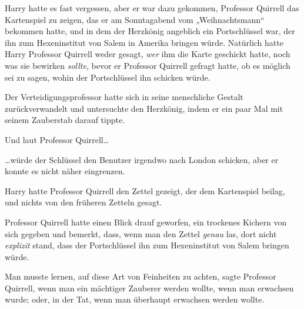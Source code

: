 Harry hatte es fast vergessen, aber er war dazu gekommen, Professor Quirrell das Kartenspiel zu zeigen, das er am Sonntagabend vom „Weihnachtsmann“ bekommen hatte, und in dem der Herzkönig angeblich ein Portschlüssel war, der ihn zum Hexeninstitut von Salem in Amerika bringen würde. Natürlich hatte Harry Professor Quirrell weder gesagt, \emph{wer} ihm die Karte geschickt hatte, noch was sie bewirken \emph{sollte}, bevor er Professor Quirrell gefragt hatte, ob es möglich sei zu sagen, wohin der Portschlüssel ihn schicken würde.

Der Verteidigungsprofessor hatte sich in seine menschliche Gestalt zurückverwandelt und untersuchte den Herzkönig, indem er ein paar Mal mit seinem Zauberstab darauf tippte.

Und laut Professor Quirrell…

…würde der Schlüssel den Benutzer irgendwo nach London schicken, aber er konnte es nicht näher eingrenzen.

Harry hatte Professor Quirrell den Zettel gezeigt, der dem Kartenspiel beilag, und nichts von den früheren Zetteln gesagt.

Professor Quirrell hatte einen Blick drauf geworfen, ein trockenes Kichern von sich gegeben und bemerkt, dass, wenn man den Zettel \emph{genau} las, dort nicht \emph{explizit} stand, dass der Portschlüssel ihn zum Hexeninstitut von Salem bringen würde.

Man musste lernen, auf diese Art von Feinheiten zu achten, sagte Professor Quirrell, wenn man ein mächtiger Zauberer werden wollte, wenn man erwachsen wurde; oder, in der Tat, wenn man überhaupt erwachsen werden wollte.

